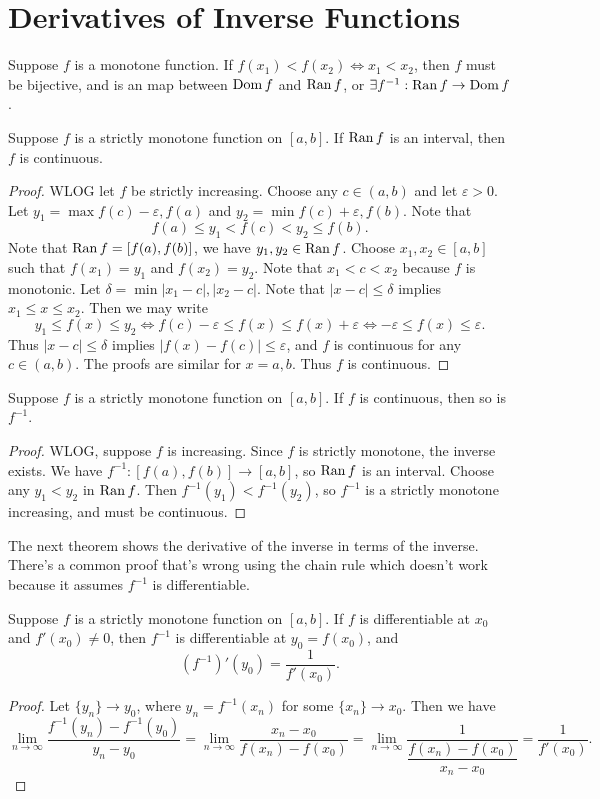 \section{Derivatives of Inverse Functions}
Suppose $f$ is a monotone function. If $f(x_1) < f(x_2) \Leftrightarrow x_1 < x_2$, then $f$ must be bijective, and is an  map between $\operatorname{Dom}{f}$ and $\operatorname{Ran}{f}$, or $\exists f^{-1}: \operatorname{Ran}{f} \to \operatorname{Dom}{f}$.  

\begin{theorem}
Suppose $f$ is a strictly monotone function on $[a,b]$. If $\operatorname{Ran}{f}$ is an interval, then $f$ is continuous. 
\end{theorem}
\begin{proof}
WLOG let $f$ be strictly increasing. Choose any $c \in (a,b)$ and let $\varepsilon>0$. Let $y_1 = \max{f(c) - \varepsilon, f(a)}$ and $y_2 = \min{f(c) + \varepsilon, f(b)}$. Note that \[ f(a) \leq y_1 < f(c) < y_2 \leq f(b). \] Note that $\operatorname{Ran}{f} = [f(a), f(b)]$, we have $y_1, y_2 \in \operatorname{Ran}{f}$. Choose $x_1, x_2 \in [a,b]$ such that $f(x_1) = y_1$ and $f(x_2) = y_2$. Note that $x_1 < c < x_2$ because $f$ is monotonic. Let $\delta = \min{|x_1 - c|, |x_2 - c|}$. Note that $|x-c| \leq \delta$ implies $x_1 \leq x \leq x_2$. Then we may write
\[ y_1 \leq f(x) \leq y_2 \Leftrightarrow f(c) - \varepsilon \leq f(x) \leq f(x) + \varepsilon \Leftrightarrow -\varepsilon \leq f(x) \leq \varepsilon .\] Thus $|x-c| \leq \delta$ implies $|f(x) - f(c)| \leq \varepsilon$, and $f$ is continuous for any $c \in (a,b)$. The proofs are similar for $x = a,b$. Thus $f$ is continuous. 
\end{proof}

\begin{theorem}
Suppose $f$ is a strictly monotone function on $[a,b]$. If $f$ is continuous, then so is $f^{-1}$. 
\end{theorem}
\begin{proof}
WLOG, suppose $f$ is increasing. Since $f$ is strictly monotone, the inverse exists. We have $f^{-1}: [f(a), f(b)] \longrightarrow [a,b]$, so $\operatorname{Ran}{f}$ is an interval. Choose any $y_1 < y_2$ in $\operatorname{Ran}{f}$. Then $f^{-1}(y_1) < f^{-1}(y_2)$, so $f^{-1}$ is a strictly monotone increasing, and must be continuous. 
\end{proof}

The next theorem shows the derivative of the inverse in terms of the inverse. There's a common proof that's wrong using the chain rule which doesn't work because it assumes $f^{-1}$ is differentiable. 
\begin{theorem}
Suppose $f$ is a strictly monotone function on $[a,b]$. If $f$ is differentiable at $x_0$ and $f'(x_0) \neq 0$, then $f^{-1}$ is differentiable at $y_0 = f(x_0)$, and 
\[ (f^{-1})'(y_0) = \dfrac{1}{f'(x_0)}. \]
\end{theorem}
\begin{proof}
Let $\{y_n\} \to y_0$, where $y_n = f^{-1}(x_n)$ for some $\{x_n\}\to x_0$. Then we have 
\[ \lim_{n\to \infty} \dfrac{f^{-1}(y_n) - f^{-1}(y_0)}{y_n - y_0} = \lim_{n\to\infty} \dfrac{x_n - x_0}{f(x_n) - f(x_0)} = \lim_{n\to\infty} \dfrac{1}{\dfrac{f(x_n) - f(x_0)}{x_n - x_0}} = \dfrac{1}{f'(x_0)}. \]
\end{proof}


